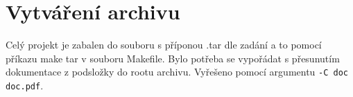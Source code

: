 \documentclass[a4paper,10pt]{article}
\begin{document}
\section{Vytváření archivu}
  Celý projekt je zabalen do souboru s příponou .tar dle zadání a to pomocí příkazu make tar v souboru Makefile.
  Bylo potřeba se vypořádat s přesunutím dokumentace z podsložky do rootu archivu. Vyřešeno pomocí argumentu \texttt{-C doc doc.pdf}.

\nocite{*}




\newpage
\thispagestyle{empty}
\end{document}
